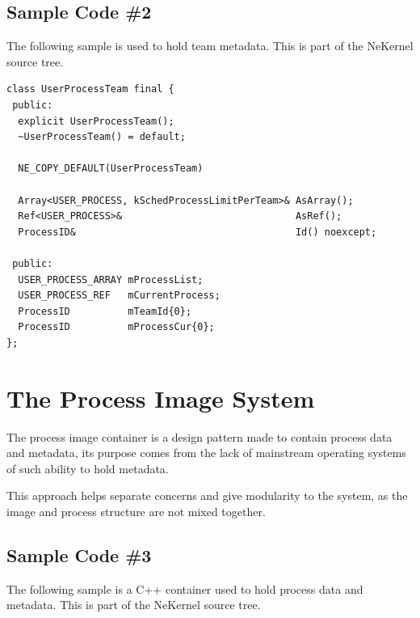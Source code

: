 \documentclass[11pt, a4paper]{article}
\begin{document}
\subsection{Sample Code \#2}

{The following sample is used to hold team metadata.} {This is part of the NeKernel source tree.}

\begin{lstlisting}
class UserProcessTeam final {
 public:
  explicit UserProcessTeam();
  ~UserProcessTeam() = default;

  NE_COPY_DEFAULT(UserProcessTeam)

  Array<USER_PROCESS, kSchedProcessLimitPerTeam>& AsArray();
  Ref<USER_PROCESS>&                              AsRef();
  ProcessID&                                      Id() noexcept;

 public:
  USER_PROCESS_ARRAY mProcessList;
  USER_PROCESS_REF   mCurrentProcess;
  ProcessID          mTeamId{0};
  ProcessID          mProcessCur{0};
};
\end{lstlisting}

\section{The Process Image System}

{The process image container is a design pattern made to contain process data and metadata, its purpose comes from the lack of mainstream operating systems of such ability to hold metadata.}

{This approach helps separate concerns and give modularity to the system, as the image and process structure are not mixed together.}

\subsection{Sample Code \#3}

{The following sample is a C++ container used to hold process data and metadata.} {This is part of the NeKernel source tree.}
\end{document}
